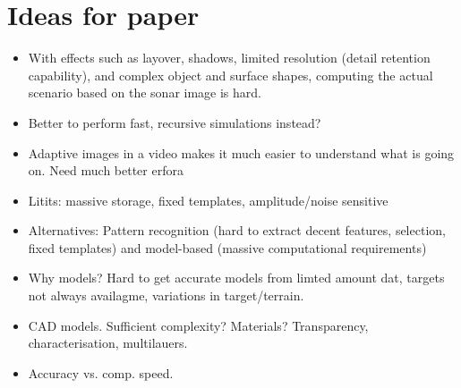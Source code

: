 \documentclass[
   article                                      %
 , 12pt                                         %
 , xelatex                                      %
 , bibtex                                       %
 , layout
]{common/mytemplate}
\begin{document}
\newpage

\section{Ideas for paper}

\begin{itemize}
\item With effects such as layover, shadows, limited resolution (detail retention capability), and complex object and surface shapes, computing the actual scenario based on the sonar image is hard.
\item Better to perform fast, recursive simulations instead?
\item Adaptive images in a video makes it much easier to understand what is going on. Need much better erfora
\item Litits: massive storage, fixed templates, amplitude/noise sensitive
\item Alternatives: Pattern recognition (hard to extract decent features, selection, fixed templates) and model-based (massive computational requirements)
\item Why models? Hard to get accurate models from limted amount dat, targets not always availagme, variations in target/terrain.
\item CAD models. Sufficient complexity? Materials? Transparency, characterisation, multilauers.
\item Accuracy vs. comp. speed.
\end{itemize}
\end{document}
